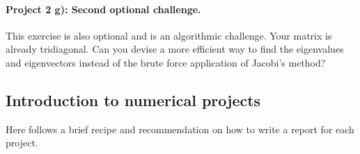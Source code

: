 \documentclass[%
oneside,                 %
final,                   %
10pt]{article}
\begin{document}
\paragraph{Project 2 g): Second optional challenge.}
This exercise is also optional and is an algorithmic challenge. Your matrix is already tridiagonal. 
Can you devise a more efficient way to find the eigenvalues and eigenvectors instead of the brute force application of Jacobi's method? 



\subsection*{Introduction to numerical projects}

Here follows a brief recipe and recommendation on how to write a report for each
project.
\end{document}
